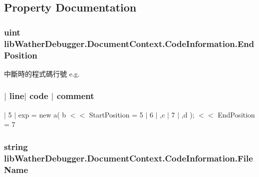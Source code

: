 \subsection{Property Documentation}
\hypertarget{classlib_wather_debugger_1_1_document_context_1_1_code_information_a3e0e6937a9dc244b66fa109806b52d49}{
\subsubsection[{End\+Position}]{\setlength{\rightskip}{0pt plus 5cm}uint lib\+Wather\+Debugger.\+Document\+Context.\+Code\+Information.\+End\+Position\hspace{0.3cm}{\ttfamily [get]}}}\label{classlib_wather_debugger_1_1_document_context_1_1_code_information_a3e0e6937a9dc244b66fa109806b52d49}


中斷時的程式碼行號 e.\+g. \subsubsection*{$\vert$ line$\vert$ code $\vert$ comment }

$\vert$ 5 $\vert$ exp = new a( b $<$$<$ Start\+Position = 5 $\vert$ 6 $\vert$ ,c $\vert$ 7 $\vert$ ,d ); $<$$<$ End\+Position = 7 

\hypertarget{classlib_wather_debugger_1_1_document_context_1_1_code_information_a58a573d3666349cd8f84e68a22f2210d}{
\subsubsection[{File\+Name}]{\setlength{\rightskip}{0pt plus 5cm}string lib\+Wather\+Debugger.\+Document\+Context.\+Code\+Information.\+File\+Name\hspace{0.3cm}{\ttfamily [get]}}}\label{classlib_wather_debugger_1_1_document_context_1_1_code_information_a58a573d3666349cd8f84e68a22f2210d}



